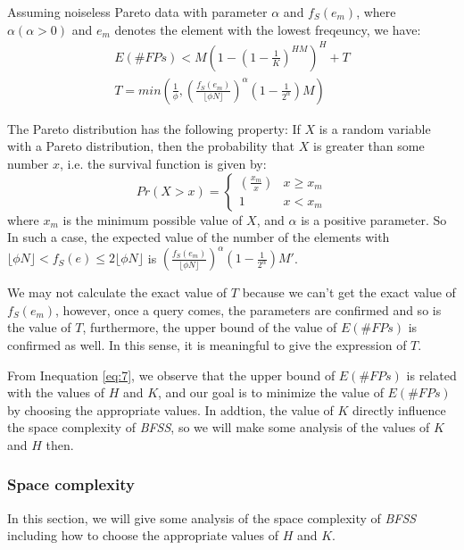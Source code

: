 \documentclass[conference]{IEEEtran}
\begin{document}
\begin{theorem}\label{thm:3}
Assuming noiseless Pareto data with parameter $\alpha$ and $f_S(e_m)$, where $\alpha (\alpha >0)$ and $e_m$ denotes the element with the lowest freqeuncy, we have:
\begin{eqnarray}\label{eq:10}
	E(\#FPs)<M(1-(1-\frac{1}{K})^{HM})^H + T\\
	T=min(\frac{1}{\phi},(\frac{f_S(e_m)}{\lfloor \phi N\rfloor})^\alpha(1-\frac{1}{2^\alpha})M)
\end{eqnarray}
\end{theorem}

\begin{IEEEproof}
The Pareto distribution has the following property: If $X$ is a random variable with a Pareto distribution, then the probability that $X$ is greater than some number $x$, i.e. the survival function is given by:
$$Pr(X>x)=
\begin{cases}
(\frac{x_m}{x}) & x\geq x_m\\
1 & x<x_m
\end{cases}$$
where $x_m$ is the minimum possible value of $X$, and $\alpha$ is a positive parameter. So In such a case, the expected value of the number of the elements with $\lfloor \phi N\rfloor<f_S(e)\leq 2\lfloor\phi N\rfloor$ is $(\frac{f_S(e_m)}{\lfloor \phi N\rfloor})^\alpha(1-\frac{1}{2^\alpha})M'$.
\end{IEEEproof}
We may not calculate the exact value of $T$ because we can't get the exact value of $f_S(e_m)$, however, once a query comes, the parameters are confirmed and so is the value of $T$, furthermore, the upper bound of the value of $E(\#FPs)$ is confirmed as well. In this sense, it is meaningful to give the expression of $T$.\par
From Inequation \ref{eq:7}, we observe that the upper bound of $E(\#FPs)$ is related with the values of $H$ and $K$, and our goal is to minimize the value of  $E(\#FPs)$ by choosing the appropriate values. In addtion, the value of $K$ directly influence the space complexity of \emph{BFSS}, so we will make some analysis of the values of $K$ and $H$ then.


\subsubsection{\textbf{Space complexity}}\label{sec:space}
In this section, we will give some analysis of the space complexity of \emph{BFSS} including how to choose the appropriate values of $H$ and $K$.
\end{document}
